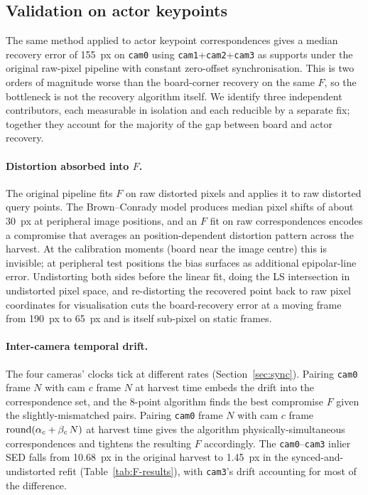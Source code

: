 \documentclass[twocolumn]{article}
\newcommand{\cam}[1]{\texttt{cam#1}}
\begin{document}
\subsection{Validation on actor keypoints}

The same method applied to actor keypoint correspondences gives a
median recovery error of 155~px on \cam{0} using \cam{1}+\cam{2}+\cam{3} as
supports under the original raw-pixel pipeline with constant
zero-offset synchronisation. This is two orders of magnitude worse
than the board-corner recovery on the same $F$, so the bottleneck is
not the recovery algorithm itself. We identify three independent
contributors, each measurable in isolation and each reducible by a
separate fix; together they account for the majority of the gap
between board and actor recovery.

\paragraph{Distortion absorbed into $F$.} The original pipeline fits
$F$ on raw distorted pixels and applies it to raw distorted query
points. The Brown--Conrady model produces median pixel shifts of
about 30~px at peripheral image positions, and an $F$ fit on raw
correspondences encodes a compromise that averages an
position-dependent distortion pattern across the harvest. At the
calibration moments (board near the image centre) this is
invisible; at peripheral test positions the bias surfaces as
additional epipolar-line error. Undistorting both sides before the
linear fit, doing the LS intersection in undistorted pixel space,
and re-distorting the recovered point back to raw pixel coordinates
for visualisation cuts the board-recovery error at a moving frame
from 190~px to 65~px and is itself sub-pixel on static frames.

\paragraph{Inter-camera temporal drift.} The four cameras' clocks
tick at different rates (Section~\ref{sec:sync}). Pairing
\cam{0} frame $N$ with cam $c$ frame $N$ at harvest time embeds the
drift into the correspondence set, and the 8-point algorithm
finds the best compromise $F$ given the slightly-mismatched pairs.
Pairing \cam{0} frame $N$ with cam $c$ frame
$\textnormal{round}(\alpha_c + \beta_c\,N)$ at harvest time gives
the algorithm physically-simultaneous correspondences and tightens
the resulting $F$ accordingly. The \cam{0}--\cam{3} inlier SED falls
from 10.68~px in the original harvest to 1.45~px in the
synced-and-undistorted refit (Table~\ref{tab:F-results}), with
\cam{3}'s drift accounting for most of the difference.
\end{document}
